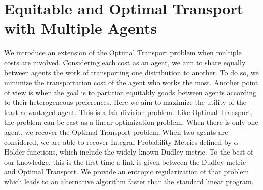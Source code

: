 \chapter{Equitable and Optimal Transport with Multiple Agents}
We introduce an extension of the Optimal Transport problem when multiple costs are involved. Considering each cost as an agent, we aim to share equally between agents the work of transporting one distribution to another. To do so, we minimize the transportation cost of the agent who works the most. Another point of view is when the goal is to partition equitably goods between agents according to their heterogeneous preferences. Here we aim to maximize the utility of the least advantaged agent. This is a fair division problem. Like Optimal Transport, the problem can be cast as a linear optimization problem. When there is only one agent, we recover the Optimal Transport problem. When two agents are considered, we are able to recover Integral Probability Metrics defined by $\alpha$-Hölder functions, which include the widely-known Dudley metric. To the best of our knowledge, this is the first time a link is given between the Dudley metric and Optimal Transport. We provide an entropic regularization of that problem which leads to an alternative algorithm faster than the standard linear program. 







%
%



